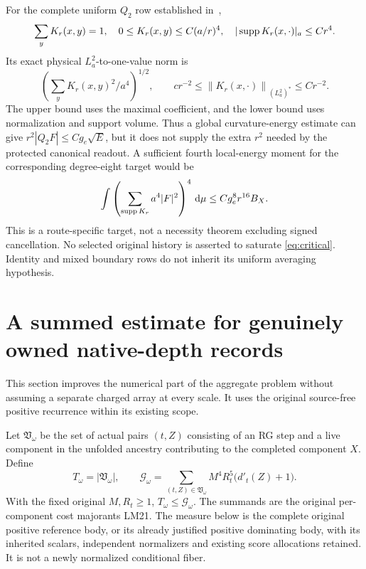 \documentclass[11pt,letterpaper]{article}
\numberwithin{equation}{section}
\theoremstyle{plain}
\theoremstyle{remark}\newtheorem{remark}[theorem]{Scope}
\newcommand{\dd}{\,\mathrm d}\newcommand{\eps}{\varepsilon}
\newcommand{\norm}[1]{\left\lVert#1\right\rVert}
\begin{document}
For the complete uniform $Q_2$ row established in~\cite[\S2]{UA},
\[
 \sum_yK_r(x,y)=1,\quad 0\le K_r(x,y)\le C(a/r)^4,
 \quad |\operatorname{supp} K_r(x,\cdot)|_a\le Cr^4.
\]
Its exact physical $L^2_a$-to-one-value norm is
\begin{equation}
 \left(\sum_yK_r(x,y)^2/a^4\right)^{1/2},
 \qquad cr^{-2}\le\norm{K_r(x,\cdot)}_{(L^2_a)^*}\le Cr^{-2}.
 \label{eq:critical}
\end{equation}
The upper bound uses the maximal coefficient, and the lower bound uses
normalization and support volume. Thus a global curvature-energy estimate
can give $r^2|Q_2F|\le Cg_e\sqrt E$, but it does not supply the extra $r^2$
needed by the protected canonical readout. A sufficient fourth local-energy
moment for the corresponding degree-eight target would be
\begin{equation}
 \int\left(\sum_{\supp K_r}a^4|F|^2\right)^4\dd\mu
 \le Cg_e^8r^{16}B_X.
 \label{eq:localenergytarget}
\end{equation}
This is a route-specific target, not a necessity theorem excluding signed
cancellation. No selected original history is asserted to saturate
\eqref{eq:critical}. Identity and mixed boundary rows do not inherit its
uniform averaging hypothesis.

\section{A summed estimate for genuinely owned native-depth records}

This section improves the numerical part of the aggregate problem without
assuming a separate charged array at every scale. It uses the original
source-free positive recurrence within its existing scope.

Let $\mathfrak V_\omega$ be the set of actual pairs $(t,Z)$ consisting of
an RG step and a live component in the unfolded ancestry contributing to
the completed component $X$. Define
\begin{equation}
 T_\omega=|\mathfrak V_\omega|,\qquad
 \mathcal G_\omega=\sum_{(t,Z)\in\mathfrak V_\omega}
      M^4R_t^5\bigl(d'_t(Z)+1\bigr).
 \label{eq:livet}
\end{equation}
With the fixed original $M,R_t\ge1$, $T_\omega\le\mathcal G_\omega$.
The summands are the original per-component cost majorants LM21.
The measure below is the complete original positive reference body, or
its already justified positive dominating body, with its inherited
scalars, independent normalizers and existing score allocations retained.
It is not a newly normalized conditional fiber.
\end{document}
